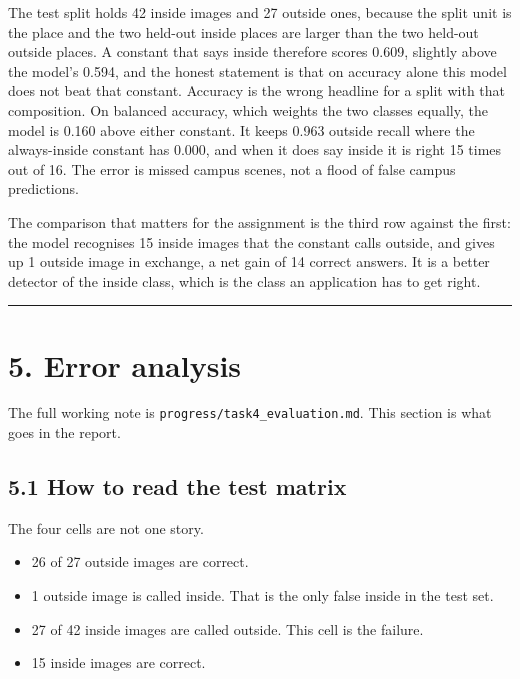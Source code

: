 \documentclass[11pt,a4paper]{article}
\providecommand{\tightlist}{%
  \setlength{\itemsep}{0pt}\setlength{\parskip}{0pt}}
\begin{document}
The test split holds 42 inside images and 27 outside ones, because the split unit is the place and the two held-out inside places are larger than the two held-out outside places. A constant that says inside therefore scores 0.609, slightly above the model's 0.594, and the honest statement is that on accuracy alone this model does not beat that constant. Accuracy is the wrong headline for a split with that composition. On balanced accuracy, which weights the two classes equally, the model is 0.160 above either constant. It keeps 0.963 outside recall where the always-inside constant has 0.000, and when it does say inside it is right 15 times out of 16. The error is missed campus scenes, not a flood of false campus predictions.

The comparison that matters for the assignment is the third row against the first: the model recognises 15 inside images that the constant calls outside, and gives up 1 outside image in exchange, a net gain of 14 correct answers. It is a better detector of the inside class, which is the class an application has to get right.

\begin{center}\rule{0.5\linewidth}{0.5pt}\end{center}

\section{5. Error analysis}\label{error-analysis}

The full working note is \texttt{progress/\allowbreak{}task4\_\allowbreak{}evaluation.md}. This section is what goes in the report.

\subsection{5.1 How to read the test matrix}\label{how-to-read-the-test-matrix}

The four cells are not one story.

\begin{itemize}
\tightlist
\item
  26 of 27 outside images are correct.
\item
  1 outside image is called inside. That is the only false inside in the test set.
\item
  27 of 42 inside images are called outside. This cell is the failure.
\item
  15 inside images are correct.
\end{itemize}
\end{document}
